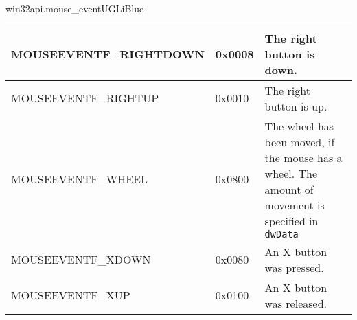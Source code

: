 \documentclass[a4paper,10pt,cours,firamath]{nsi}
\begin{document}
\begin{encadrecolore}{win32api.mouse\_event}{UGLiBlue}
\begin{center}
\begin{tabularx}{\textwidth}{|X|X|X|}
			MOUSEEVENTF\_RIGHTDOWN      & 
			0x0008                      & 
			The right button is down.                                                                                                                                                                                                                                                                                                                                                                                                                                                         \\\hline
			MOUSEEVENTF\_RIGHTUP        & 
			0x0010                      & 
			The right button is up.                                                                                                                                                                                                                                                                                                                                                                                                                                                           \\\hline
			MOUSEEVENTF\_WHEEL          & 
			0x0800                      & 
			The wheel has been moved, if the mouse has a wheel. The amount of movement is specified in \texttt{dwData}                                                                                                                                                                                                                                                                                                                                                                        \\\hline
			MOUSEEVENTF\_XDOWN          & 
			0x0080                      & 
			An X button was pressed.                                                                                                                                                                                                                                                                                                                                                                                                                                                          \\\hline
			MOUSEEVENTF\_XUP            & 
			0x0100                      & 
			An X button was released.                                                                                                                                                                                                                                                                                                                                                                                                                                                         \\\hline

\end{tabularx}
\end{center}
\end{encadrecolore}
\end{document}
